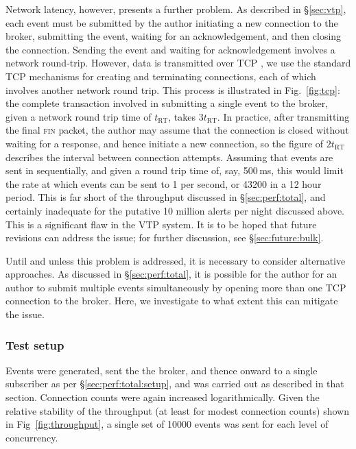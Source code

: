 \documentclass[5p,authoryear]{elsarticle}
\begin{document}
Network latency, however, presents a further problem. As described in
\S\ref{sec:vtp}, each event must be submitted by the author initiating a new
connection to the broker, submitting the event, waiting for an
acknowledgement, and then closing the connection. Sending the event and
waiting for acknowledgement involves a network round-trip.  However, data is
transmitted over TCP \citep{Cerf:1974}, we use the standard TCP mechanisms for
creating and terminating connections, each of which involves another network
round trip. This process is illustrated in Fig.~\ref{fig:tcp}: the complete
transaction involved in submitting a single event to the broker, given a
network round trip time of $t_\mathrm{RT}$, takes $3 t_\mathrm{RT}$. In
practice, after transmitting the final \textsc{fin} packet, the author may
assume that the connection is closed without waiting for a response, and hence
initiate a new connection, so the figure of $2 t_\mathrm{RT}$ describes the
interval between connection attempts.  Assuming that events are sent in
sequentially, and given a round trip time of, say, 500\,ms, this would limit
the rate at which events can be sent to 1 per second, or 43200 in a 12 hour
period. This is far short of the throughput discussed in
\S\ref{sec:perf:total}, and certainly inadequate for the putative 10 million
alerts per night discussed above. This is a significant flaw in the VTP
system. It is to be hoped that future revisions can address the issue; for
further discussion, see \S\ref{sec:future:bulk}.

Until and unless this problem is addressed, it is necessary to consider
alternative approaches. As discussed in \S\ref{sec:perf:total}, it is possible
for the author for an author to submit multiple events simultaneously by
opening more than one TCP connection to the broker. Here, we investigate to
what extent this can mitigate the issue.

\subsubsection{Test setup}

Events were generated, sent the the broker, and thence onward to a single
subscriber as per \S\ref{sec:perf:total:setup}, and was carried out as
described in that section. Connection counts were again increased
logarithmically.  Given the relative stability of the throughput (at least for
modest connection counts) shown in Fig~\ref{fig:throughput}, a single set of
10000 events was sent for each level of concurrency.
\end{document}
